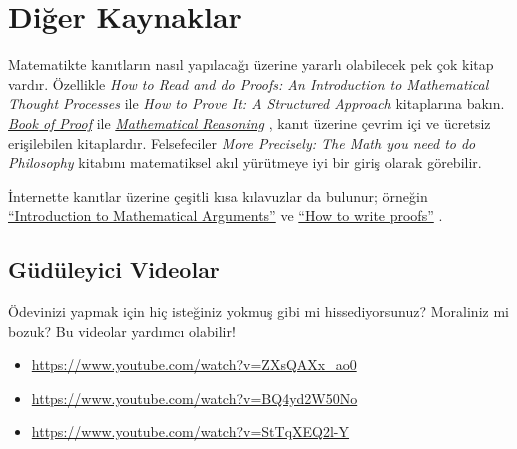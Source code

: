 


\section{Diğer Kaynaklar}

Matematikte kanıtların nasıl yapılacağı üzerine yararlı olabilecek pek
çok kitap vardır. Özellikle \emph{How to Read and do Proofs: An
Introduction to Mathematical Thought Processes} \citep{Solow2013} ile
\emph{How to Prove It: A Structured Approach} \citep{Velleman2019}
kitaplarına bakın. \href{http://www.people.vcu.edu/~rhammack/BookOfProof/BookOfProof.pdf}{\emph{Book
of Proof}} \citep{Hammack2013} ile
\href{https://scholarworks.gvsu.edu/books/7/}{\emph{Mathematical
Reasoning}} \citep{Sandstrum2019}, kanıt üzerine çevrim içi ve ücretsiz
erişilebilen kitaplardır. Felsefeciler
\emph{More Precisely: The Math you need to do Philosophy}
\citep{Steinhart2018} kitabını matematiksel akıl yürütmeye iyi bir giriş
olarak görebilir.

İnternette kanıtlar üzerine çeşitli kısa kılavuzlar da bulunur; örneğin
\href{https://math.berkeley.edu/~hutching/teach/proofs.pdf}{``Introduction
  to Mathematical Arguments''} \citep{Hutchings2003} ve
\href{https://eugeniacheng.com/wp-content/uploads/2017/02/cheng-proofguide.pdf}{``How to
  write proofs''} \citep{Cheng2004}.

\subsection{Güdüleyici Videolar}

Ödevinizi yapmak için hiç isteğiniz yokmuş gibi mi hissediyorsunuz?
Moraliniz mi bozuk? Bu videolar yardımcı olabilir!

\begin{itemize}
\item \url{https://www.youtube.com/watch?v=ZXsQAXx_ao0}
\item \url{https://www.youtube.com/watch?v=BQ4yd2W50No}
\item \url{https://www.youtube.com/watch?v=StTqXEQ2l-Y}
\end{itemize}

